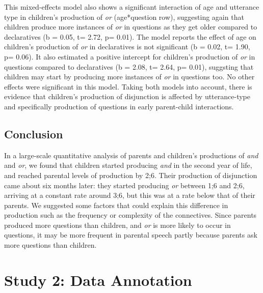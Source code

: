 \documentclass[
  english,
  ,man,floatsintext]{apa6}
\begin{document}
This mixed-effects model also shows a significant interaction of age and utterance type in children's production of \emph{or} (age*question row), suggesting again that children produce more instances of \emph{or} in questions as they get older compared to declaratives (b = 0.05, t= 2.72, p= 0.01). The model reports the effect of age on children's production of \emph{or} in declaratives is not significant (b = 0.02, t= 1.90, p= 0.06). It also estimated a positive intercept for children's production of \emph{or} in questions compared to declaratives (b = 2.08, t= 2.64, p= 0.01), suggsting that children may start by producing more instances of \emph{or} in questions too. No other effects were significant in this model. Taking both models into account, there is evidence that children's production of disjunction is affected by utterance-type and specifically production of questions in early parent-child interactions.

\hypertarget{study1discussion}{%
\subsection{Conclusion}\label{study1discussion}}

In a large-scale quantitative analysis of parents and children's productions of \emph{and} and \emph{or}, we found that children started producing \emph{and} in the second year of life, and reached parental levels of production by 2;6. Their production of disjunction came about six months later: they started producing \emph{or} between 1;6 and 2;6, arriving at a constant rate around 3;6, but this was at a rate below that of their parents. We suggested some factors that could explain this difference in production such as the frequency or complexity of the connectives. Since parents produced more questions than children, and \emph{or} is more likely to occur in questions, it may be more frequent in parental speech partly because parents ask more questions than children.

\hypertarget{study-2-data-annotation}{%
\section{Study 2: Data Annotation}\label{study-2-data-annotation}}
\end{document}
